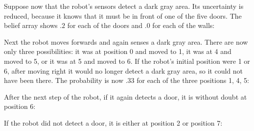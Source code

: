 Suppose now that the robot's sensors detect a dark gray area. Its uncertainty is reduced, because it knows that it must be in front of one of the five doors. The belief array shows $.2$ for each of the doors and $.0$ for each of the walls:
\begin{center}
\end{center}
\vspace{-1ex}
Next the robot moves forwards and again senses a dark gray area. There are now only three possibilities: it was at position 0 and moved to 1, it was at 4 and moved to 5, or it was at 5 and moved to 6. If the robot's initial position were 1 or 6, after moving right it would no longer detect a dark gray area, so it could not have been there. The probability is now $.33$ for each of the three positions 1, 4, 5:
\begin{center}
\end{center}
\vspace{-1ex}
After the next step of the robot, if it again detects a door, it is without doubt at position 6:
\begin{center}
\end{center}
\vspace{-1ex}
\noindent{}If the robot did not detect a door, it is either at position 2 or position 7:
